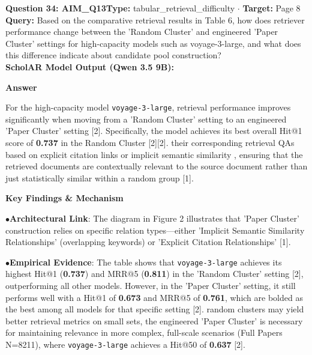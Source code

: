 \documentclass[10pt,a4paper]{article}
\begin{document}
\begin{tcolorbox}[questionbox]
{\noindent\bfseries\large\color{navy} Question 34: AIM\_Q13}\hfill {\footnotesize\color{darkteal}\textbf{Type:} tabular\_retrieval\_difficulty $\cdot$ \textbf{Target:} Page 8}\\[4pt]
{\noindent\bfseries\color{accentblue} Query: } Based on the comparative retrieval results in Table 6, how does retriever performance change between the 'Random Cluster' and engineered 'Paper Cluster' settings for high-capacity models such as voyage-3-large, and what does this difference indicate about candidate pool construction?\\[6pt]
{\noindent\bfseries\color{navy} ScholAR Model Output (Qwen 3.5 9B):}\\[2pt]
{\small \noindent \textbf{Answer}\par\vspace{3pt}For the high-capacity model \texttt{voyage-3-large}, retrieval performance improves significantly when moving from a 'Random Cluster' setting to an engineered 'Paper Cluster' setting [2]. Specifically, the model achieves its best overall Hit@1 score of \textbf{0.737} in the Random Cluster [2][2].  their corresponding retrieval QAs based on explicit citation links or implicit semantic similarity , ensuring that the retrieved documents are contextually relevant to the source document rather than just statistically similar within a random group [1].\par\vspace{3pt}\noindent \textbf{Key Findings \& Mechanism}\par\vspace{3pt}\noindent\hspace*{8pt}$\bullet$\hspace*{4pt}\textbf{Architectural Link}: The diagram in Figure 2 illustrates that 'Paper Cluster' construction relies on specific relation types---either 'Implicit Semantic Similarity Relationships' (overlapping keywords) or 'Explicit Citation Relationships' [1].\par\vspace{3pt}\noindent\hspace*{8pt}$\bullet$\hspace*{4pt}\textbf{Empirical Evidence}: The table shows that \texttt{voyage-3-large} achieves its highest Hit@1 (\textbf{0.737}) and MRR@5 (\textbf{0.811}) in the 'Random Cluster' setting [2], outperforming all other models. However, in the 'Paper Cluster' setting, it still performs well with a Hit@1 of \textbf{0.673} and MRR@5 of \textbf{0.761}, which are bolded as the best among all models for that specific setting [2]. random clusters may yield better retrieval metrics on small sets, the engineered 'Paper Cluster' is necessary for maintaining relevance in more complex, full-scale scenarios (Full Papers N=8211), where \texttt{voyage-3-large} achieves a Hit@50 of \textbf{0.637} [2].}\\[6pt]

\end{tcolorbox}
\end{document}
